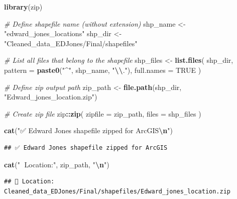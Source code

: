 \documentclass[
]{article}
\newenvironment{Shaded}{\begin{snugshade}}{\end{snugshade}}
\newcommand{\AttributeTok}[1]{\textcolor[rgb]{0.13,0.29,0.53}{#1}}
\newcommand{\CommentTok}[1]{\textcolor[rgb]{0.56,0.35,0.01}{\textit{#1}}}
\newcommand{\ConstantTok}[1]{\textcolor[rgb]{0.56,0.35,0.01}{#1}}
\newcommand{\FunctionTok}[1]{\textcolor[rgb]{0.13,0.29,0.53}{\textbf{#1}}}
\newcommand{\NormalTok}[1]{#1}
\newcommand{\OtherTok}[1]{\textcolor[rgb]{0.56,0.35,0.01}{#1}}
\newcommand{\SpecialCharTok}[1]{\textcolor[rgb]{0.81,0.36,0.00}{\textbf{#1}}}
\newcommand{\StringTok}[1]{\textcolor[rgb]{0.31,0.60,0.02}{#1}}
\begin{document}
\begin{Shaded}
\begin{Highlighting}[]
\FunctionTok{library}\NormalTok{(zip)}

\CommentTok{\# Define shapefile name (without extension)}
\NormalTok{shp\_name }\OtherTok{\textless{}{-}} \StringTok{"edward\_jones\_locations"}
\NormalTok{shp\_dir  }\OtherTok{\textless{}{-}} \StringTok{"Cleaned\_data\_EDJones/Final/shapefiles"}

\CommentTok{\# List all files that belong to the shapefile}
\NormalTok{shp\_files }\OtherTok{\textless{}{-}} \FunctionTok{list.files}\NormalTok{(}
\NormalTok{  shp\_dir,}
  \AttributeTok{pattern =} \FunctionTok{paste0}\NormalTok{(}\StringTok{"\^{}"}\NormalTok{, shp\_name, }\StringTok{"}\SpecialCharTok{\textbackslash{}\textbackslash{}}\StringTok{."}\NormalTok{),}
  \AttributeTok{full.names =} \ConstantTok{TRUE}
\NormalTok{)}

\CommentTok{\# Define zip output path}
\NormalTok{zip\_path }\OtherTok{\textless{}{-}} \FunctionTok{file.path}\NormalTok{(shp\_dir, }\StringTok{"Edward\_jones\_location.zip"}\NormalTok{)}

\CommentTok{\# Create zip file}
\NormalTok{zip}\SpecialCharTok{::}\FunctionTok{zip}\NormalTok{(}
  \AttributeTok{zipfile =}\NormalTok{ zip\_path,}
  \AttributeTok{files =}\NormalTok{ shp\_files}
\NormalTok{)}

\FunctionTok{cat}\NormalTok{(}\StringTok{"✅ Edward Jones shapefile zipped for ArcGIS}\SpecialCharTok{\textbackslash{}n}\StringTok{"}\NormalTok{)}
\end{Highlighting}
\end{Shaded}

\begin{verbatim}
## ✅ Edward Jones shapefile zipped for ArcGIS
\end{verbatim}

\begin{Shaded}
\begin{Highlighting}[]
\FunctionTok{cat}\NormalTok{(}\StringTok{"📁 Location:"}\NormalTok{, zip\_path, }\StringTok{"}\SpecialCharTok{\textbackslash{}n}\StringTok{"}\NormalTok{)}
\end{Highlighting}
\end{Shaded}

\begin{verbatim}
## 📁 Location: Cleaned_data_EDJones/Final/shapefiles/Edward_jones_location.zip
\end{verbatim}
\end{document}
